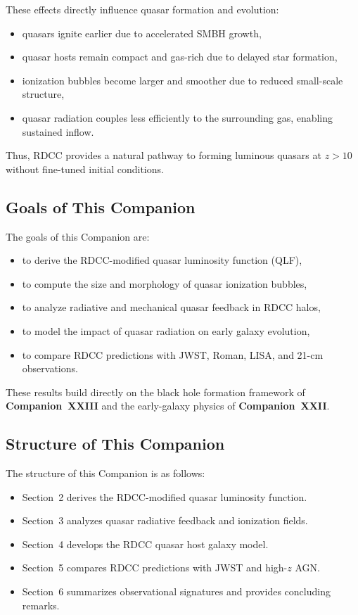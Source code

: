\documentclass[11pt,a4paper]{article}
\begin{document}
These effects directly influence quasar formation and evolution:
\begin{itemize}
\item quasars ignite earlier due to accelerated SMBH growth,
\item quasar hosts remain compact and gas-rich due to delayed star formation,
\item ionization bubbles become larger and smoother due to reduced small-scale structure,
\item quasar radiation couples less efficiently to the surrounding gas, enabling sustained inflow.
\end{itemize}

Thus, RDCC provides a natural pathway to forming luminous quasars at $z > 10$ without
fine-tuned initial conditions.

\subsection{Goals of This Companion}

The goals of this Companion are:
\begin{itemize}
\item to derive the RDCC-modified quasar luminosity function (QLF),
\item to compute the size and morphology of quasar ionization bubbles,
\item to analyze radiative and mechanical quasar feedback in RDCC halos,
\item to model the impact of quasar radiation on early galaxy evolution,
\item to compare RDCC predictions with JWST, Roman, LISA, and 21-cm observations.
\end{itemize}

These results build directly on the black hole formation framework of
\textbf{Companion~XXIII} and the early-galaxy physics of \textbf{Companion~XXII}.

\subsection{Structure of This Companion}

The structure of this Companion is as follows:
\begin{itemize}
\item Section~2 derives the RDCC-modified quasar luminosity function.
\item Section~3 analyzes quasar radiative feedback and ionization fields.
\item Section~4 develops the RDCC quasar host galaxy model.
\item Section~5 compares RDCC predictions with JWST and high-$z$ AGN.
\item Section~6 summarizes observational signatures and provides concluding remarks.
\end{itemize}
\end{document}
